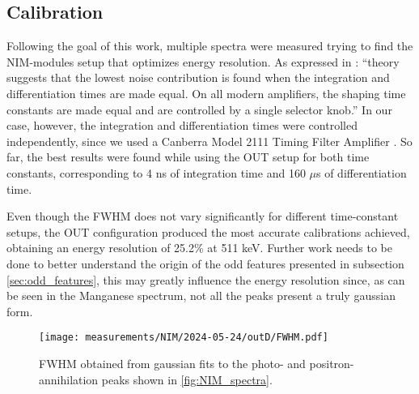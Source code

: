 
\subsection{Calibration}

Following the goal of this work, multiple spectra were measured trying to find the NIM-modules setup that optimizes energy resolution. As expressed in \cite[Sec.~4.4.3]{gilmore2008practical}: ``theory suggests that the lowest noise contribution is found when the integration and differentiation times are made equal. On all modern amplifiers, the shaping time constants are made equal and are controlled by a single selector knob.'' In our case, however, the integration and differentiation times were controlled independently, since we used a Canberra Model 2111 Timing Filter Amplifier \cite{CanberraTFA}. So far, the best results were found while using the OUT setup for both time constants, corresponding to 4 ns of integration time and 160 $\mu$s of differentiation time. 

Even though the FWHM does not vary significantly for different time-constant setups, the OUT configuration produced the most accurate calibrations achieved, obtaining an energy resolution of 25.2\% at 511 keV. Further work needs to be done to better understand the origin of the odd features presented in subsection \ref{sec:odd_features}, this may greatly influence the energy resolution since, as can be seen in the Manganese spectrum, not all the peaks present a truly gaussian form.

\begin{figure}[H]
  \centering
  \texttt{[image: measurements/NIM/2024-05-24/outD/FWHM.pdf]}
  \caption{\label{fig:NIM_FWHM}FWHM obtained from gaussian fits to the photo- and positron-annihilation peaks shown in \ref{fig:NIM_spectra}.}
\end{figure}

